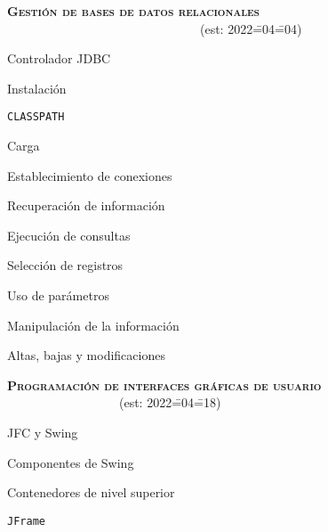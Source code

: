 \begin{longenum}
\begin{longenum}
\begin{longenum}
\begin{longenum}
            \end{longenum}
        \end{longenum}
    \end{longenum}
    \item \textbf{\textsc{Gestión de bases de datos relacionales}} \ \ \ \ \ \ \ \ \ \ \ \ \ \ \ \ \ \ \ \ \ \ \ \ \ \ \ \ \ \ \ (est: 2022\==04\==04)
    \begin{longenum}
        \item Controlador JDBC
        \begin{longenum}
            \item Instalación
            \item \texttt{CLASSPATH}
            \item Carga
        \end{longenum}
        \item Establecimiento de conexiones
        \item Recuperación de información
        \begin{longenum}
            \item Ejecución de consultas
            \item Selección de registros
            \item Uso de parámetros
        \end{longenum}
        \item Manipulación de la información
        \begin{longenum}
            \item Altas, bajas y modificaciones
        \end{longenum}
    \end{longenum}
    \item \textbf{\textsc{Programación de interfaces gráficas de usuario}} \ \ \ \ \ \ \ \ \ \ \ \ \ \ \ \ \ \ (est: 2022\==04\==18)
    \begin{longenum}
        \item JFC y Swing
        \item Componentes de Swing
        \item Contenedores de nivel superior
        \begin{longenum}
            \item \texttt{JFrame}

\end{longenum}
\end{longenum}
\end{longenum}
